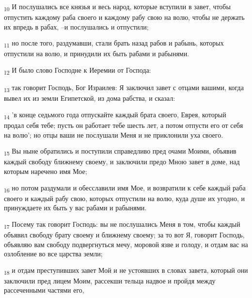 \begin{tcolorbox}
\textsubscript{10} И послушались все князья и весь народ, которые вступили в завет, чтобы отпустить каждому раба своего и каждому рабу свою на волю, чтобы не держать их впредь в рабах, --и послушались и отпустили;
\end{tcolorbox}
\begin{tcolorbox}
\textsubscript{11} но после того, раздумавши, стали брать назад рабов и рабынь, которых отпустили на волю, и принудили их быть рабами и рабынями.
\end{tcolorbox}
\begin{tcolorbox}
\textsubscript{12} И было слово Господне к Иеремии от Господа:
\end{tcolorbox}
\begin{tcolorbox}
\textsubscript{13} так говорит Господь, Бог Израилев: Я заключил завет с отцами вашими, когда вывел их из земли Египетской, из дома рабства, и сказал:
\end{tcolorbox}
\begin{tcolorbox}
\textsubscript{14} 'в конце седьмого года отпускайте каждый брата своего, Еврея, который продал себя тебе; пусть он работает тебе шесть лет, а потом отпусти его от себя на волю'; но отцы ваши не послушали Меня и не приклонили уха своего.
\end{tcolorbox}
\begin{tcolorbox}
\textsubscript{15} Вы ныне обратились и поступили справедливо пред очами Моими, объявив каждый свободу ближнему своему, и заключили предо Мною завет в доме, над которым наречено имя Мое;
\end{tcolorbox}
\begin{tcolorbox}
\textsubscript{16} но потом раздумали и обесславили имя Мое, и возвратили к себе каждый раба своего и каждый рабу свою, которых отпустили на волю, куда душе их угодно, и принуждаете их быть у вас рабами и рабынями.
\end{tcolorbox}
\begin{tcolorbox}
\textsubscript{17} Посему так говорит Господь: вы не послушались Меня в том, чтобы каждый объявил свободу брату своему и ближнему своему; за то вот Я, говорит Господь, объявляю вам свободу подвергнуться мечу, моровой язве и голоду, и отдам вас на озлобление во все царства земли;
\end{tcolorbox}
\begin{tcolorbox}
\textsubscript{18} и отдам преступивших завет Мой и не устоявших в словах завета, который они заключили пред лицем Моим, рассекши тельца надвое и пройдя между рассеченными частями его,
\end{tcolorbox}
